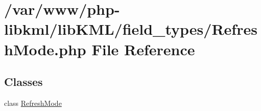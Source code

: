 \hypertarget{RefreshMode_8php}{
\section{/var/www/php-\/libkml/libKML/field\_\-types/RefreshMode.php File Reference}
\label{dd/d8e/RefreshMode_8php}
}
\subsection*{Classes}
\begin{DoxyCompactItemize}
\item 
class \hyperlink{classRefreshMode}{RefreshMode}
\end{DoxyCompactItemize}
